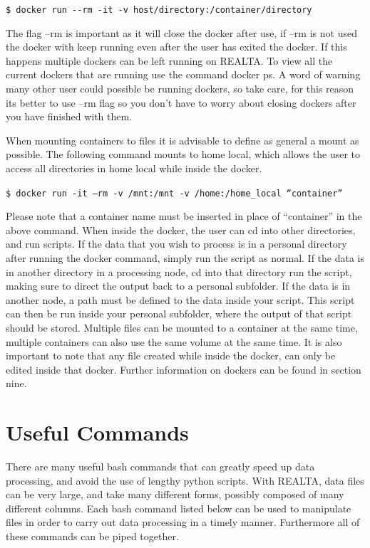 \documentclass[11pt,fleqn]{book} %
\begin{document}
\vspace{3mm}

\verb|$ docker run --rm -it -v host/directory:/container/directory|

\vspace{3mm}


The flag --rm is important as it will close the docker after use, if --rm is not used the docker with keep running even after the user has exited the docker. If this happens multiple dockers can be left running on REALTA. To view all the current dockers that are running use the command docker ps. A word of warning many other user could possible be running dockers, so take care, for this reason its better to use –rm flag so you don’t have to worry about closing dockers after you have finished with them. 

When mounting containers to files it is advisable to define as general a mount as possible. The following command mounts to home local, which allows the user to access all directories in home local while inside the docker.

\vspace{3mm}

\verb|$ docker run -it –rm -v /mnt:/mnt -v /home:/home_local “container”|

\vspace{3mm}


Please note that a container name must be inserted in place of “container” in the above command. When inside the docker, the user can cd into other directories, and run scripts. If the data that you wish to process is in a personal directory after running the docker command, simply run the script as normal. If the data is in another directory in a processing node, cd into that directory run the script, making sure to direct the output back to a personal subfolder. If the data is in another node, a path must be defined to the data inside your script. This script can then be run inside your personal subfolder, where the output of that script should be stored. Multiple files can be mounted to a container at the same time, multiple containers can also use the same volume at the same time. It is also important to note that any file created while inside the docker, can only be edited inside that docker. Further information on dockers can be found in section nine.


\section{Useful Commands}
There are many useful bash commands that can greatly speed up data processing, and avoid the use of lengthy python scripts. With REALTA, data files can be very large, and take many different forms, possibly composed of many different columns. Each bash command listed below can be used to manipulate files in order to carry out data processing in a timely manner. Furthermore all of these commands can be piped together.
\vspace{3mm}
\end{document}
